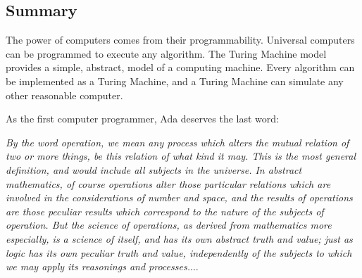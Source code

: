 \begin{schemeregion}



\section{Summary}

The power of computers comes from their programmability.  Universal computers can be programmed to execute any algorithm.  The Turing Machine model provides a simple, abstract, model of a computing machine.  Every algorithm can be implemented as a Turing Machine, and a Turing Machine can simulate any other reasonable computer.

As the first computer programmer, Ada deserves the last word:
\begin{smallquote}{\em
By the word operation, we mean any process which alters the mutual relation of two or more things, be this relation of what kind it may. This is the most general definition, and would include all subjects in the universe. In abstract mathematics, of course operations alter those particular relations which are involved in the considerations of number and space, and the results of operations are those peculiar results which correspond to the nature of the subjects of operation. But the science of operations, as derived from mathematics more especially, is a science of itself, and has its own abstract truth and value; just as logic has its own peculiar truth and value, independently of the subjects to which we may apply its reasonings and processes.$\ldots$

}
\end{smallquote}
\end{schemeregion}
